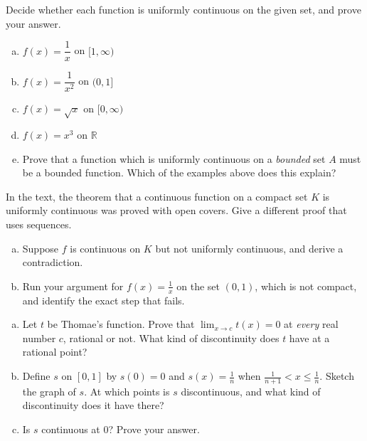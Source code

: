 \begin{problem}
Decide whether each function is uniformly continuous on the given set, and prove your answer.
\begin{enumerate}[(a)]
	\item $f(x) = \dfrac1x$ on $[1, \infty)$
	\item $f(x) = \dfrac{1}{x^2}$ on $(0,1]$
	\item $f(x) = \sqrt{x}$ on $[0, \infty)$
	\item $f(x) = x^3$ on $\mathbb{R}$
	\item Prove that a function which is uniformly continuous on a \emph{bounded} set $A$ must be a bounded function.  Which of the examples above does this explain?
\end{enumerate}
\end{problem}

\begin{problem}
In the text, the theorem that a continuous function on a compact set $K$ is uniformly continuous was proved with open covers.  Give a different proof that uses sequences.
\begin{enumerate}[(a)]
	\item Suppose $f$ is continuous on $K$ but not uniformly continuous, and derive a contradiction.
	\item Run your argument for $f(x) = \frac1x$ on the set $(0,1)$, which is not compact, and identify the exact step that fails.
\end{enumerate}
\end{problem}

\begin{problem}
\begin{enumerate}[(a)]
	\item Let $t$ be Thomae's function.  Prove that $\lim_{x \to c} t(x) = 0$ at \emph{every} real number $c$, rational or not.  What kind of discontinuity does $t$ have at a rational point?
	\item Define $s$ on $[0,1]$ by $s(0) = 0$ and $s(x) = \frac1n$ when $\frac{1}{n+1} < x \leq \frac1n$.  Sketch the graph of $s$.  At which points is $s$ discontinuous, and what kind of discontinuity does it have there?
	\item Is $s$ continuous at $0$?  Prove your answer.
\end{enumerate}
\end{problem}
